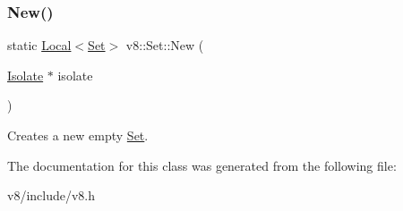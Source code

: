 \subsubsection{\texorpdfstring{New()}{New()}}
{\footnotesize\ttfamily static \mbox{\hyperlink{classv8_1_1Local}{Local}}$<$\mbox{\hyperlink{classv8_1_1Set}{Set}}$>$ v8\+::\+Set\+::\+New (\begin{DoxyParamCaption}\item[{\mbox{\hyperlink{classv8_1_1Isolate}{Isolate}} $\ast$}]{isolate }\end{DoxyParamCaption})\hspace{0.3cm}{\ttfamily [static]}}

Creates a new empty \mbox{\hyperlink{classv8_1_1Set}{Set}}. 

The documentation for this class was generated from the following file\+:\begin{DoxyCompactItemize}
\item 
v8/include/v8.\+h\end{DoxyCompactItemize}
